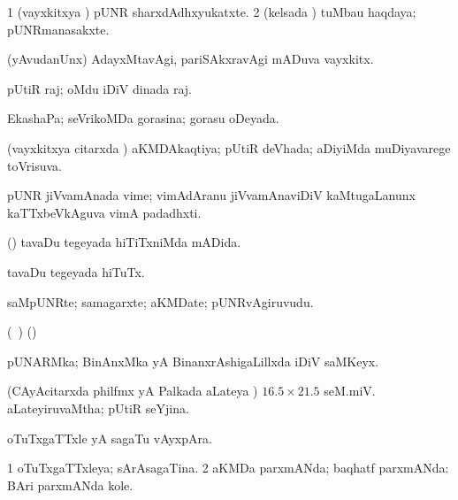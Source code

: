 {{{{{{\bentry
{}
  \gl{\nA}\bmng
\bnum
\num{1} (vayxkitxya \vi) pUNR sharxdAdhxyukatxte. 
\num{2} (kelsada \vi) tuMbau haqdaya; pUNRmanasakxte. 
\enum
\emng
\eentry

\bentry
{}
  \gl{\nA}\bmng
(yAvudanUnx) AdayxMtavAgi, pariSAkxravAgi mADuva vayxkitx. 
\emng
\eentry

\bentry
{}
 \gl{\nA}\bmng
pUtiR raj; oMdu iDiV dinada raj. 
\emng
\eentry

\bentry
{} 
\gl{\gu}
\expl{}
\bmng
EkashaPa; seVrikoMDa gorasina; gorasu oDeyada. 
\emng
\eentry

\bentry
{}
  \gl{\gu}\bmng
(vayxkitxya citarxda \vi) aKMDAkaqtiya; pUtiR deVhada; aDiyiMda muDiyavarege toVrisuva. 
\emng
\eentry

\bentry
{}
 \gl{\nA}\bmng
pUNR jiVvamAnada vime; vimAdAranu jiVvamAnaviDiV kaMtugaLanunx kaTTxbeVkAguva vimA padadhxti. 
\emng
\eentry

\bentry
{}
  \gl{\gu}\bmng
(\birx) tavaDu tegeyada hiTiTxniMda mADida. 
\emng
\eentry

\bentry
{}
\gl{\nA}
\bmng
tavaDu tegeyada hiTuTx. 
\emng
\eentry

\bentry
{}
  \gl{\nA}\bmng
saMpUNRte; samagarxte; aKMDate; pUNRvAgiruvudu. 
\emng
\eentry

\bentry
{}
 \gl{\nA}\bmng
(\kanmu\ \ame) (\saM)  
\emng
\eentry

\bentry
{}
 \gl{\nA}\bmng
pUNARMka; BinAnxMka yA BinanxrAshigaLillxda iDiV saMKeyx. 
\emng
\eentry

\bentry
{} 
\gl{\gu}
\expl{}
\bmng
(CAyAcitarxda philfmx yA Palkada aLateya \vi) $16.5 \times 21.5$ seM.miV. aLateyiruvaMtha; pUtiR seYjina. 
\emng
\eentry

\bentry
{} 
\gl{\nA}
\expl{}
\bmng
oTuTxgaTTxle yA sagaTu vAyxpAra. 
\emng
\eentry

\bentry
{} 
\gl{\gu}
\bmng
\bnum
\num{1} oTuTxgaTTxleya; sArAsagaTina. 
\num{2} aKMDa parxmANda; baqhatf parxmANda:  BAri parxmANda kole. 
\enum
\emng
\eentry

}}}}}}

